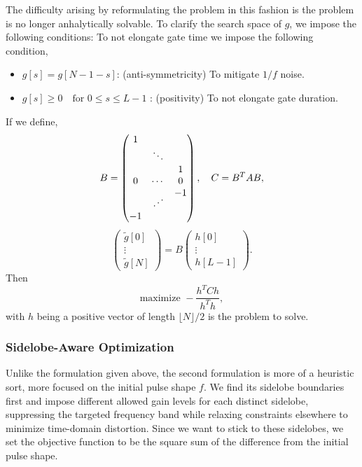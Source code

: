 The difficulty arising by reformulating the problem in this fashion is the problem is no longer anhalytically solvable.
To clarify the search space of $g$, we impose the following conditions:
To not elongate gate time we impose the following condition,
\begin{itemize}
  \item ${g}[s] = {g}[N-1-s]$: (anti-symmetricity) To mitigate $1/f$ noise.
  \item ${g}[s] \geq 0 \quad \text{for }0\leq s\leq L-1$ : (positivity) To not elongate gate duration.
\end{itemize}
If we define,
$$B = \begin{pmatrix} 1 & & \\ & \ddots & \\  &  & 1\\0 & \cdots & 0 \\  &  & -1 \\& \mathinner{\mkern2mu\raise1pt\hbox{.}\mkern2mu\raise4pt\hbox{.}\mkern2mu\raise7pt\hbox{.}\mkern1mu} & \\ -1 & &  \end{pmatrix}, \quad C = B^T A B,$$
$$\begin{pmatrix} \tilde{g}[0] \\ \vdots \\ \tilde{g}[N] \end{pmatrix} = B \begin{pmatrix} h[0] \\ \vdots \\ h[L-1] \end{pmatrix}.$$
Then
$$\text{maximize } -\frac{h^T C h}{h^T h},$$
with $h$ being a positive vector of length $\lfloor N\rfloor/2$ is the problem to solve.
\subsubsection{Sidelobe-Aware Optimization}
Unlike the formulation given above, the second formulation is more of a heuristic sort, more focused on the initial pulse
shape $f$. We find its sidelobe boundaries first and impose
different allowed gain levels for each distinct sidelobe, suppressing the targeted frequency band while relaxing
constraints elsewhere to minimize time-domain distortion. Since we want to stick to these sidelobes, we set the
objective function to be the square sum of the difference from the initial pulse shape.


